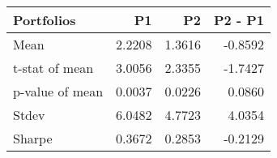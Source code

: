 \begin{tabular}{lrrr}
\toprule
Portfolios & P1 & P2 & P2 - P1 \\
\midrule
Mean & 2.2208 & 1.3616 & -0.8592 \\
t-stat of mean & 3.0056 & 2.3355 & -1.7427 \\
p-value of mean & 0.0037 & 0.0226 & 0.0860 \\
Stdev & 6.0482 & 4.7723 & 4.0354 \\
Sharpe & 0.3672 & 0.2853 & -0.2129 \\
\bottomrule
\end{tabular}
